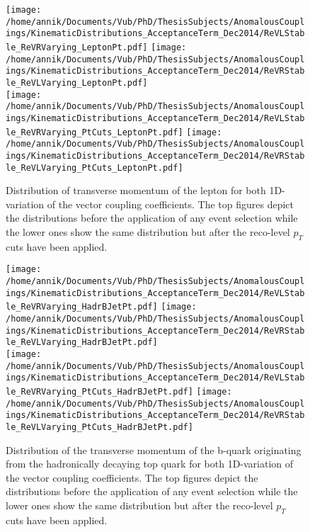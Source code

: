 \begin{figure}[!h]
 \centering
 \texttt{[image: /home/annik/Documents/Vub/PhD/ThesisSubjects/AnomalousCouplings/KinematicDistributions\_AcceptanceTerm\_Dec2014/ReVLStable\_ReVRVarying\_LeptonPt.pdf]}
 \texttt{[image: /home/annik/Documents/Vub/PhD/ThesisSubjects/AnomalousCouplings/KinematicDistributions\_AcceptanceTerm\_Dec2014/ReVRStable\_ReVLVarying\_LeptonPt.pdf]}\\
 \texttt{[image: /home/annik/Documents/Vub/PhD/ThesisSubjects/AnomalousCouplings/KinematicDistributions\_AcceptanceTerm\_Dec2014/ReVLStable\_ReVRVarying\_PtCuts\_LeptonPt.pdf]}
 \texttt{[image: /home/annik/Documents/Vub/PhD/ThesisSubjects/AnomalousCouplings/KinematicDistributions\_AcceptanceTerm\_Dec2014/ReVRStable\_ReVLVarying\_PtCuts\_LeptonPt.pdf]}
 \caption{Distribution of transverse momentum of the lepton for both 1D-variation of the vector coupling coefficients. The top figures depict the distributions before the application of any event selection while the lower ones show the same distribution but after the reco-level $p_T$ cuts have been applied.}
 \label{fig::KinChangeLeptonPt}
\end{figure}

\begin{figure}[!h]
 \centering
 \texttt{[image: /home/annik/Documents/Vub/PhD/ThesisSubjects/AnomalousCouplings/KinematicDistributions\_AcceptanceTerm\_Dec2014/ReVLStable\_ReVRVarying\_HadrBJetPt.pdf]}
 \texttt{[image: /home/annik/Documents/Vub/PhD/ThesisSubjects/AnomalousCouplings/KinematicDistributions\_AcceptanceTerm\_Dec2014/ReVRStable\_ReVLVarying\_HadrBJetPt.pdf]}\\
 \texttt{[image: /home/annik/Documents/Vub/PhD/ThesisSubjects/AnomalousCouplings/KinematicDistributions\_AcceptanceTerm\_Dec2014/ReVLStable\_ReVRVarying\_PtCuts\_HadrBJetPt.pdf]}
 \texttt{[image: /home/annik/Documents/Vub/PhD/ThesisSubjects/AnomalousCouplings/KinematicDistributions\_AcceptanceTerm\_Dec2014/ReVRStable\_ReVLVarying\_PtCuts\_HadrBJetPt.pdf]}
 \caption{Distribution of the transverse momentum of the b-quark originating from the hadronically decaying top quark for both 1D-variation of the vector coupling coefficients. The top figures depict the distributions before the application of any event selection while the lower ones show the same distribution but after the reco-level $p_T$ cuts have been applied.}
 \label{fig::KinChangeBJetPt}
\end{figure}

